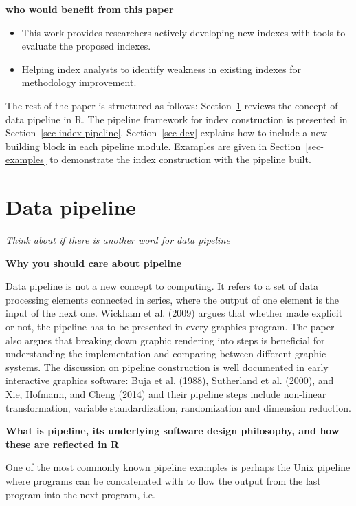 \documentclass[
]{interact}
\providecommand{\tightlist}{%
  \setlength{\itemsep}{0pt}\setlength{\parskip}{0pt}}\usepackage{longtable,booktabs,array}
\begin{document}
\textbf{who would benefit from this paper}

\begin{itemize}
\tightlist
\item
  This work provides researchers actively developing new indexes with
  tools to evaluate the proposed indexes.
\item
  Helping index analysts to identify weakness in existing indexes for
  methodology improvement.
\end{itemize}

The rest of the paper is structured as follows:
Section~\ref{sec-pipeline} reviews the concept of data pipeline in R.
The pipeline framework for index construction is presented in
Section~\ref{sec-index-pipeline}. Section~\ref{sec-dev} explains how to
include a new building block in each pipeline module. Examples are given
in Section~\ref{sec-examples} to demonstrate the index construction with
the pipeline built.

\hypertarget{sec-pipeline}{%
\section{Data pipeline}\label{sec-pipeline}}

\emph{Think about if there is another word for data pipeline}

\textbf{Why you should care about pipeline}

Data pipeline is not a new concept to computing. It refers to a set of
data processing elements connected in series, where the output of one
element is the input of the next one. Wickham et al. (2009) argues that
whether made explicit or not, the pipeline has to be presented in every
graphics program. The paper also argues that breaking down graphic
rendering into steps is beneficial for understanding the implementation
and comparing between different graphic systems. The discussion on
pipeline construction is well documented in early interactive graphics
software: Buja et al. (1988), Sutherland et al. (2000), and Xie,
Hofmann, and Cheng (2014) and their pipeline steps include non-linear
transformation, variable standardization, randomization and dimension
reduction.

\textbf{What is pipeline, its underlying software design philosophy, and
how these are reflected in R}

One of the most commonly known pipeline examples is perhaps the Unix
pipeline where programs can be concatenated with \texttt{\textbar{}} to
flow the output from the last program into the next program, i.e.~
\end{document}
